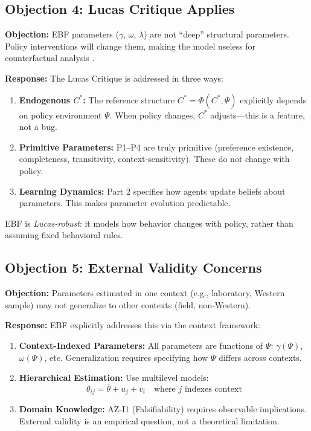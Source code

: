 \subsection{Objection 4: Lucas Critique Applies}

\textbf{Objection:} EBF parameters ($\gamma$, $\omega$, $\lambda$) are not
``deep'' structural parameters. Policy interventions will change them, making
the model useless for counterfactual analysis \citep{lucas1976econometric}.

\textbf{Response:} The Lucas Critique is addressed in three ways:

\begin{enumerate}
\item \textbf{Endogenous $C^*$:} The reference structure $C^* = \Phi(C^*, \Psi)$
explicitly depends on policy environment $\Psi$. When policy changes, $C^*$
adjusts---this is a feature, not a bug.

\item \textbf{Primitive Parameters:} P1--P4 are truly primitive (preference
existence, completeness, transitivity, context-sensitivity). These do not
change with policy.

\item \textbf{Learning Dynamics:} Part 2 specifies how agents update beliefs
about parameters. This makes parameter evolution predictable.
\end{enumerate}

EBF is \textit{Lucas-robust}: it models how behavior changes with policy,
rather than assuming fixed behavioral rules.

\subsection{Objection 5: External Validity Concerns}

\textbf{Objection:} Parameters estimated in one context (e.g., laboratory,
Western sample) may not generalize to other contexts (field, non-Western).

\textbf{Response:} EBF explicitly addresses this via the context framework:

\begin{enumerate}
\item \textbf{Context-Indexed Parameters:} All parameters are functions of $\Psi$:
$\gamma(\Psi)$, $\omega(\Psi)$, etc. Generalization requires specifying how
$\Psi$ differs across contexts.

\item \textbf{Hierarchical Estimation:} Use multilevel models:
\begin{equation}
\theta_{ij} = \bar{\theta} + u_j + v_i \quad \text{where } j \text{ indexes context}
\end{equation}

\item \textbf{Domain Knowledge:} AZ-I1 (Falsifiability) requires observable
implications. External validity is an empirical question, not a theoretical
limitation.
\end{enumerate}

